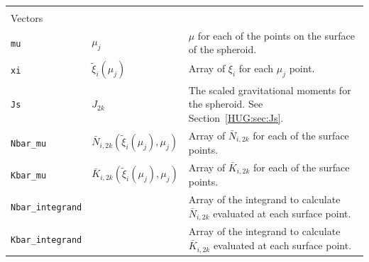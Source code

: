 \documentclass[11pt, oneside]{article}   	%
\begin{document}
\begin{longtable}{l l p{10cm}}
\multicolumn{3}{l}{} \\
\multicolumn{3}{l}{Vectors} \\
\hline
\texttt{mu} & $\mu_j$ & $\mu$ for each of the points on the surface of the spheroid. \\
\texttt{xi} & $\tilde{\xi}_i (\mu_j)$ & Array of $\xi_i$ for each $\mu_j$ point. \\
\texttt{Js} & $J_{2k}$ & The scaled gravitational moments for the spheroid. See Section~\ref{HUG:sec:Js}. \\
\texttt{Nbar\_mu} & $\bar{N}_{i,2k} (\tilde{\xi}_i (\mu_j), \mu_j)$ & Array of  $\bar{N}_{i,2k} $ for each of the surface points. \\
\texttt{Kbar\_mu} & $\bar{K}_{i,2k} (\tilde{\xi}_i (\mu_j), \mu_j)$ & Array of  $\bar{K}_{i,2k} $ for each of the surface points. \\
\texttt{Nbar\_integrand} &  & Array of the integrand to calculate $\bar{N}_{i,2k}$ evaluated at each surface point. \\
\texttt{Kbar\_integrand} &  & Array of the integrand to calculate $\bar{K}_{i,2k}$ evaluated at each surface point. \\


\end{longtable}
\end{document}
